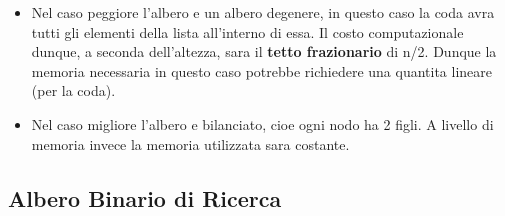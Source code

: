 \begin{itemize}
	\item Nel caso peggiore l'albero e un albero degenere, in questo caso la coda avra tutti gli elementi della lista all'interno di essa. Il costo computazionale dunque, a seconda dell'altezza, sara il \textbf{tetto frazionario} di n/2. Dunque la memoria necessaria in questo caso potrebbe richiedere una quantita lineare (per la coda).
	\item Nel caso migliore l'albero e bilanciato, cioe ogni nodo ha 2 figli. A livello di memoria invece la memoria utilizzata sara costante.
\end{itemize}

\subsection{Albero Binario di Ricerca}

